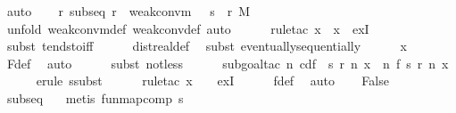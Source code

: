 \documentclass{article}
\theoremstyle{definition}
\begin{document}
\begin{isabellebody}
\ auto\isanewline
\ \ \isamarkupfalse%
\ {\isachardoublequoteopen}{\isasymAnd}r{\isachardot}\ subseq\ r\ {\isasymLongrightarrow}\ {\isasymnot}weak{\isacharunderscore}conv{\isacharunderscore}m\ {\isacharparenleft}{\isasymmu}\ {\isasymcirc}\ s\ {\isasymcirc}\ r{\isacharparenright}\ M{\isachardoublequoteclose}\isanewline
\ \ \ \ \isamarkupfalse%
\ {\isacharparenleft}unfold\ weak{\isacharunderscore}conv{\isacharunderscore}m{\isacharunderscore}def\ weak{\isacharunderscore}conv{\isacharunderscore}def{\isacharcomma}\ auto{\isacharparenright}\isanewline
\ \ \ \ \isamarkupfalse%
\ {\isacharparenleft}rule{\isacharunderscore}tac\ x\ {\isacharequal}\ x\ \ exI{\isacharparenright}\isanewline
\ \ \ \ \isamarkupfalse%
\ {\isacharparenleft}subst\ tendsto{\isacharunderscore}iff{\isacharparenright}\isanewline
\ \ \ \ \isamarkupfalse%
\ dist{\isacharunderscore}real{\isacharunderscore}def\ \isamarkupfalse%
\ {\isacharparenleft}subst\ eventually{\isacharunderscore}sequentially{\isacharparenright}\isanewline
\ \ \ \ \isamarkupfalse%
\ x\ \isamarkupfalse%
\ F{\isacharunderscore}def\ \isamarkupfalse%
\ auto\isanewline
\ \ \ \ \isamarkupfalse%
\ {\isacharparenleft}subst\ not{\isacharunderscore}less{\isacharparenright}\isanewline
\ \ \ \ \isamarkupfalse%
\ {\isacharparenleft}subgoal{\isacharunderscore}tac\ {\isachardoublequoteopen}{\isacharparenleft}{\isasymlambda}n{\isachardot}\ cdf\ {\isacharparenleft}{\isasymmu}\ {\isacharparenleft}s\ {\isacharparenleft}r\ n{\isacharparenright}{\isacharparenright}{\isacharparenright}\ x{\isacharparenright}\ {\isacharequal}\ {\isacharparenleft}{\isasymlambda}n{\isachardot}\ f\ {\isacharparenleft}s\ {\isacharparenleft}r\ n{\isacharparenright}{\isacharparenright}\ x{\isacharparenright}{\isachardoublequoteclose}{\isacharparenright}\isanewline
\ \ \ \ \isamarkupfalse%
\ {\isacharparenleft}erule\ ssubst{\isacharparenright}\isanewline
\ \ \ \ \isamarkupfalse%
\ {\isacharparenleft}rule{\isacharunderscore}tac\ x\ {\isacharequal}\ {\isasymepsilon}\ \ exI{\isacharparenright}\isanewline
\ \ \ \ \isamarkupfalse%
\ f{\isacharunderscore}def\ \isamarkupfalse%
\ auto\isanewline
\ \ \isamarkupfalse%
\ False\ \isamarkupfalse%
\ subseq\ {\isacharasterisk}\ \isamarkupfalse%
\ {\isacharparenleft}metis\ fun{\isachardot}map{\isacharunderscore}comp\ s{\isacharparenright}\ \isanewline
{}
\end{isabellebody}
\end{document}
